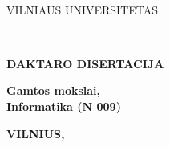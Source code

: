 \newpage
\thispagestyle{empty}                   %
{\selectfont
\linespread{1.15}\selectfont
\renewcommand\bfdefault{m}
\begin{flushright}
    \thesisDOI \\
    \thesisORCID
\end{flushright}

\begin{center}
	\vspace*{5mm}	
	\begin{flushleft}
         \fontsize{12}{12}\selectfont
	       VILNIAUS UNIVERSITETAS \\
	\end{flushleft}
 
	\vspace{50mm}
	\begin{flushleft}
	   {\fontsize{15}{15}\selectfont  \thesisAuthorName \  \thesisAuthorSurname \par}
    \end{flushleft}

	\vspace{10mm}
	\begin{flushleft}
    	{ \fontsize{21}{21}\selectfont
    	   \thesisTitleLT \par
    	}
    \end{flushleft}

    \vspace{50mm minus 45mm}
    \begin{flushleft}
        \renewcommand\bfdefault{b}
        \fontsize{12}{12}\selectfont
        {\bf DAKTARO DISERTACIJA}\\ 
    \end{flushleft}
    
    \vspace{5mm}
    \begin{flushleft}
        \renewcommand\bfdefault{m}
        \fontsize{12}{12}\selectfont
        \bf
            Gamtos mokslai, \\ %
            Informatika (N 009)  %
    \end{flushleft}
    
    \vspace{6mm}
    \begin{flushleft} 
         \fontsize{9}{9}\selectfont
        \bf VILNIUS, \thesisYear
    \end{flushleft} 
\end{center}
}

